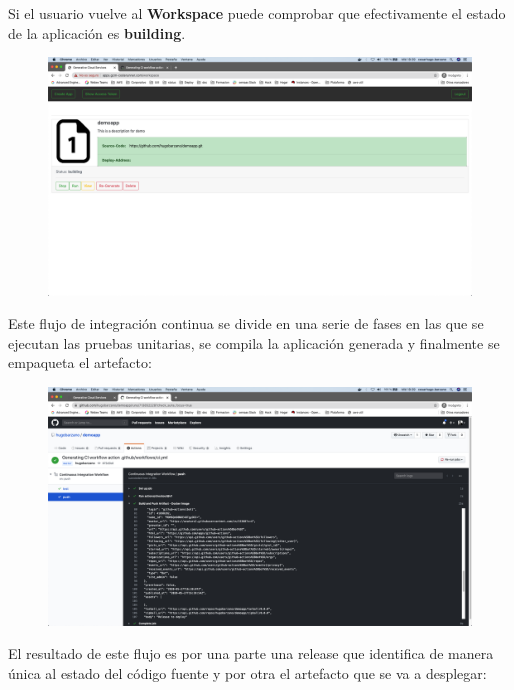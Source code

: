\documentclass[a4paper,11pt]{book}
\begin{document}
Si el usuario vuelve al \textbf{Workspace} puede comprobar que efectivamente el estado de la aplicación es \textbf{building}. 
\begin{figure}[H]
\centering
\includegraphics[scale=0.2]{imagenes/casouso/12.png}
\caption{   }
\end{figure}


Este flujo de integración continua se divide en una serie de fases en las que se ejecutan las pruebas unitarias, se compila la aplicación generada y finalmente se empaqueta el artefacto:

\begin{figure}[H]
\centering
\includegraphics[scale=0.2]{imagenes/casouso/13.png}
\caption{   }
\end{figure}

El resultado de este flujo es por una parte una release que identifica de manera única al estado del código fuente y por otra el artefacto que se va a desplegar: 
\end{document}
